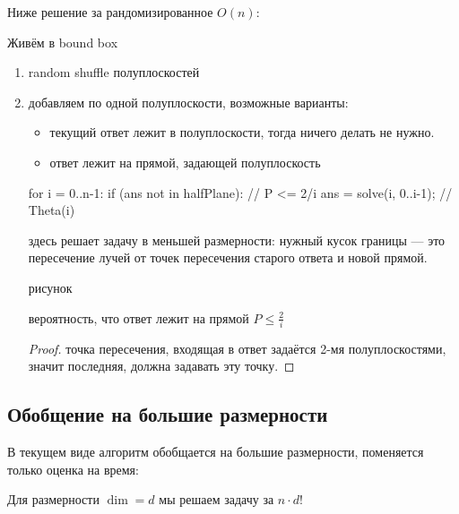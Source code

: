Ниже решение за рандомизированное $O(n)$:

\begin{rem}
    Живём в bound box
\end{rem}

\begin{enumerate}
    \item random shuffle полуплоскостей
    \item добавляем по одной полуплоскости, возможные варианты: 
        \begin{itemize}
            \item текущий ответ лежит в полуплоскости, тогда ничего делать не нужно.
            \item ответ лежит на прямой, задающей полуплоскость
        \end{itemize}
        \begin{cppcode}
            for i = 0..n-1:
                if (ans not in halfPlane):  // P <= 2/i
                    ans = solve(i, 0..i-1); // Theta(i)
        \end{cppcode}

        здесь  решает задачу в меньшей размерности: нужный кусок
        границы --- это пересечение лучей от точек пересечения старого ответа
        и новой прямой.

        \TODO рисунок

        \begin{lemma}
            вероятность, что ответ лежит на прямой $P \leq \frac{2}{i}$
        \end{lemma}

        \begin{proof}
            точка пересечения, входящая в ответ задаётся 2-мя полуплоскостями,
            значит последняя, должна задавать эту точку.
        \end{proof}
\end{enumerate}

\subsection{Обобщение на большие размерности}

В текущем виде алгоритм обобщается на большие размерности, поменяется только
оценка на время:

\begin{theorem}
Для размерности $\dim = d$ мы решаем задачу за $n \cdot d!$
\end{theorem}

